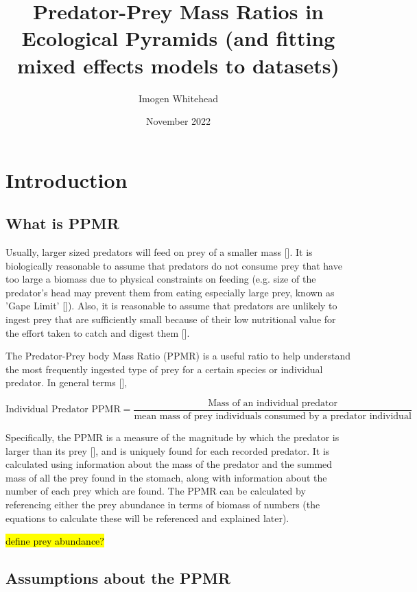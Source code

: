 \documentclass{article}
\title{Predator-Prey Mass Ratios in Ecological Pyramids (and fitting mixed effects models to datasets)}
\author{Imogen Whitehead}
\date{November 2022}
\begin{document}
\maketitle

\section{Introduction}

\subsection{What is PPMR}

Usually, larger sized predators will feed on prey of a smaller mass [\cite{barnes2010}]. It is biologically reasonable to assume that predators do not consume prey that have too large a biomass due to physical constraints on feeding (e.g. size of the predator's head may prevent them from eating especially large prey, known as 'Gape Limit' [\cite{webb1993}]). Also, it is reasonable to assume that predators are unlikely to ingest prey that are sufficiently small because of their low nutritional value for the effort taken to catch and digest them [\cite{tsai2016}].

The Predator-Prey body Mass Ratio (PPMR) is a useful ratio to help understand the most frequently ingested type of prey for a certain species or individual predator. In general terms [\cite{nakazawa2011}], 

$$\text{Individual Predator PPMR} = \frac{\text{Mass of an individual predator}}{\text{mean mass of prey individuals consumed by a predator individual}}$$

Specifically, the PPMR is a measure of the magnitude by which the predator is larger than its prey [\cite{tsai2016}], and is uniquely found for each recorded predator.  It is calculated using information about the mass of the predator and the summed mass of all the prey found in the stomach, along with information about the number of each prey which are found. The PPMR can be calculated by referencing either the prey abundance in terms of biomass of numbers (the equations to calculate these will be referenced and explained later). 

\hl{define prey abundance?}

\subsection{Assumptions about the PPMR}
\end{document}
